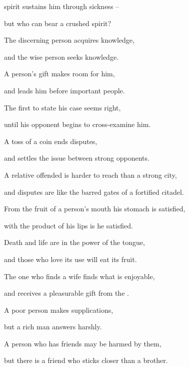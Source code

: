{spirit
sustains
him through sickness
–
\par }{\Q but who can
bear
a crushed
spirit?
\par }{\Q {}The discerning
person
acquires
knowledge,
\par }{\Q and the wise
person seeks
knowledge.
\par }{\Q {}A person’s
gift
makes room
for him,
\par }{\Q and leads
him before
important people.
\par }{\Q {}The first
to state his case
seems right,
\par }{\Q until his opponent begins
to cross-examine him.
\par }{\Q {}A toss of a coin
ends
disputes,
\par }{\Q and settles the issue
between
strong opponents.
\par }{\Q {}A relative
offended is harder
to reach than a strong
city,
\par }{\Q and disputes
are like the barred
gates of a fortified citadel.
\par }{\Q {}From the fruit
of a person’s
mouth
his stomach
is satisfied,
\par }{\Q with the product
of his lips
is he satisfied.
\par }{\Q {}Death
and life
are in the power
of the tongue,
\par }{\Q and those who love
its use will eat
its fruit.
\par }{\Q {}The one who finds
a wife
finds
what is enjoyable,
\par }{\Q and receives
a pleasurable
gift from the
{}.
\par }{\Q {}A poor person makes
supplications,
\par }{\Q but
a rich
man answers
harshly.
\par }{\Q {}A person
who has friends
may be harmed
by them,

\par }{\Q but there
is a friend
who sticks
closer than a brother.

}
